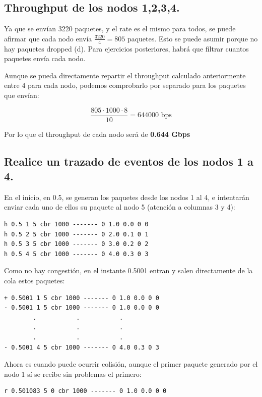 \documentclass{article}
\begin{document}
\subsection{Throughput de los nodos 1,2,3,4.}

Ya que se envían 3220 paquetes, y el rate es el mismo para todos, se puede afirmar que cada nodo envía \(\frac{3220}{4} = 805 \) paquetes. Esto se puede asumir porque no hay paquetes dropped (d). Para ejercicios posteriores, habrá que filtrar cuantos paquetes envía cada nodo.

Aunque se pueda directamente repartir el throughput calculado anteriormente entre 4 para cada nodo, podemos comprobarlo por separado para los paquetes que envían:

$$\frac{805 \cdot 1000 \cdot 8}{10} = 644000 \text{ bps} $$

Por lo que el throughput de cada nodo será de \textbf{ 0.644 Gbps}

\subsection{Realice un trazado de eventos de los nodos 1 a 4.}

En el inicio, en 0.5, se generan los paquetes desde los nodos 1 al 4, e intentarán enviar cada uno de ellos su paquete al nodo 5 (atención a columnas 3 y 4):

\begin{verbatim}
h 0.5 1 5 cbr 1000 ------- 0 1.0 0.0 0 0
h 0.5 2 5 cbr 1000 ------- 0 2.0 0.1 0 1
h 0.5 3 5 cbr 1000 ------- 0 3.0 0.2 0 2
h 0.5 4 5 cbr 1000 ------- 0 4.0 0.3 0 3
\end{verbatim}

Como no hay congestión, en el instante 0.5001 entran y salen directamente de la cola estos paquetes:

\begin{verbatim}
+ 0.5001 1 5 cbr 1000 ------- 0 1.0 0.0 0 0
- 0.5001 1 5 cbr 1000 ------- 0 1.0 0.0 0 0
        .           .           .
        .           .           .
        .           .           .
- 0.5001 4 5 cbr 1000 ------- 0 4.0 0.3 0 3
\end{verbatim}

Ahora es cuando puede ocurrir colisión, aunque el primer paquete generado por el nodo 1 sí se recibe sin problemas el primero:

\begin{verbatim}
r 0.501083 5 0 cbr 1000 ------- 0 1.0 0.0 0 0
\end{verbatim}
\end{document}

